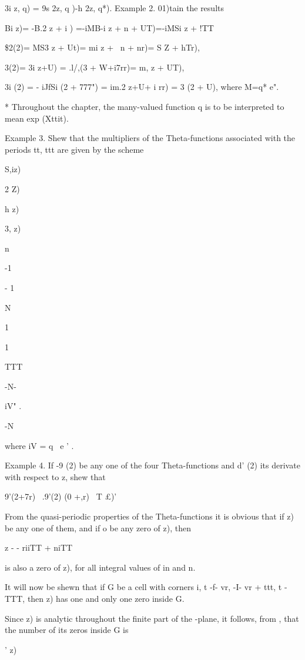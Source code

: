 3i z, q) = 9s 2z, q )-h 2z, q*). Example 2. 01)tain the results

Bi z)= -B.2 z + i ) =-iMB-i z + n + UT)=-iMSi z + !TT\

\$2(2)= MS3 z + Ut)= mi z + \ n + nr)= S Z + hTr),

 3(2)= 3i z+U) = .l/,(3 + W+i7rr)= m, z + UT),

3i (2) = - iJfSi (2 + 777") = im.2 z+U+ i rr) = 3 (2 + U), where M=q*
e".

* Throughout the chapter, the many-valued function q is to be
interpreted to mean exp (Xttit).

%
%

Example 3. Shew that the multipliers of the Theta-functions associated
with the periods tt, ttt are given by the scheme

S,iz)

 2 Z)

h z)

3, z)

n

-1

- 1

N

1

1

TTT

-N-

iV" .

-N

where iV = q~ e ' .

Example 4. If -9 (2) be any one of the four Theta-functions and d' (2)
its derivate with respect to z, shew that

 9'(2+7r) \ .9'(2) (0 +,r) ~T £)'


From the quasi-periodic properties of the Theta-functions it is
obvious that if z) be any one of them, and if o be any zero of z),
then

z - - riiTT + niTT

is also a zero of z), for all integral values of in and n.

It will now be shewn that if G be a cell with corners i, t -f- vr, -I-
vr + ttt, t - TTT, then z) has one and only one zero inside G.

Since z) is analytic throughout the finite part of the -plane, it
follows, from , that the number of its zeros inside G is

 ' z)

